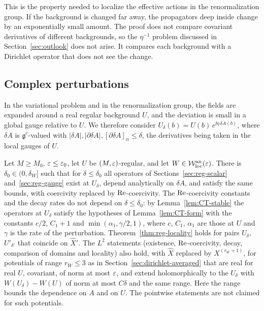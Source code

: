 This is the property needed to localize the effective actions in the renormalization group. If the background is changed far away, the propagators deep inside change by an exponentially small amount. The proof does not compare covariant derivatives of different backgrounds, so the $\eta^{-1}$ problem discussed in Section~\ref{sec:outlook} does not arise. It compares each background with a Dirichlet operator that does not see the change.

\subsection{Complex perturbations}\label{subsec:reg-complex}

In the variational problem and in the renormalization group, the fields are expanded around a real regular background $U$, and the deviation is small in a global gauge relative to $U$. We therefore consider $U_\delta(b)=U(b)\,e^{\ii\eta\,\delta\!A(b)}$, where $\delta\!A$ is $\mathfrak g^c$-valued with $|\delta\!A|,|\partial\delta\!A|,[\partial\delta\!A]_\alpha\le\delta$, the derivatives being taken in the local gauges of $U$.

\begin{proposition}\label{prop:reg-complex}
Let $M\ge M_0$, $\varepsilon\le\varepsilon_0$, let $U$ be $(M,\varepsilon)$-regular, and let $W\in\mathcal W^{\rm an}_{\rm loc}(\varepsilon)$. There is $\delta_0\in(0,\delta_W]$ such that for $\delta\le\delta_0$ all operators of Sections~\ref{sec:reg-scalar} and~\ref{sec:reg-gauge} exist at $U_\delta$, depend analytically on $\delta\!A$, and satisfy the same bounds, with coercivity replaced by $\operatorname{Re}$-coercivity. The $\operatorname{Re}$-coercivity constants and the decay rates do not depend on $\delta\le\delta_0$: by Lemma~\ref{lem:CT-stable} the operators at $U_\delta$ satisfy the hypotheses of Lemma~\ref{lem:CT-form} with the constants $c/2$, $C_1+1$ and $\min(\alpha_1,\gamma/2,1)$, where $c$, $C_1$, $\alpha_1$ are those at $U$ and $\gamma$ is the rate of the perturbation. Theorem~\ref{thm:reg-locality} holds for pairs $U_\delta$, $U'_{\delta'}$ that coincide on $\hat X'$.
 The $L^2$ statements (existence, $\operatorname{Re}$-coercivity, decay, comparison of domains and locality) also hold, with $\hat X$ replaced by $X^{(r_W+1)}$, for potentials of range $r_W\le3$ as in Section~\ref{sec:dirichlet-averaged} that are real for real $U$, covariant, of norm at most $\varepsilon$, and extend holomorphically to the $U_\delta$ with $W(U_\delta)-W(U)$ of norm at most $C\delta$ and the same range. Here the range bounds the dependence on $A$ and on $U$. The pointwise statements are not claimed for such potentials.
\end{proposition}

